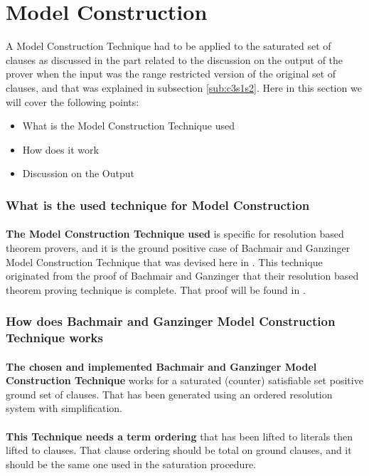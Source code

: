 \section{Model Construction}\label{sec:c3s2}
A Model Construction Technique had to be applied to the saturated set of clauses as discussed in the part related to the discussion on the output of the prover when the input was the range restricted version of the original set of clauses, and that was explained in subsection \ref{sub:c3s1s2}. Here in this section we will cover the following points:

	\begin{itemize}
		\item What is the Model Construction Technique used
		\item How does it work
		\item Discussion on the Output
	\end{itemize}
	
	
	\subsubsection{What is the used technique for Model Construction}
		\paragraph{}
		\textbf{The Model Construction Technique used} is specific for resolution based theorem provers, and it is the ground positive case of Bachmair and Ganzinger Model Construction Technique that was devised here in \cite{BGMC}. This technique originated from the proof of Bachmair and Ganzinger that their resolution based theorem proving technique is complete. That proof will be found in \cite{BAGA01}.
		
		
	\subsubsection{How does Bachmair and Ganzinger Model Construction Technique works}
		\paragraph{}		
		\textbf{The chosen and implemented Bachmair and Ganzinger Model Construction Technique} works for a saturated (counter) satisfiable set positive ground set of clauses. That has been generated using an ordered resolution system with simplification. 
		
		\paragraph{}
		\textbf{This Technique needs a term ordering} that has been lifted to literals then lifted to clauses. That clause ordering should be total on ground clauses, and it should be the same one used in the saturation procedure.
		
